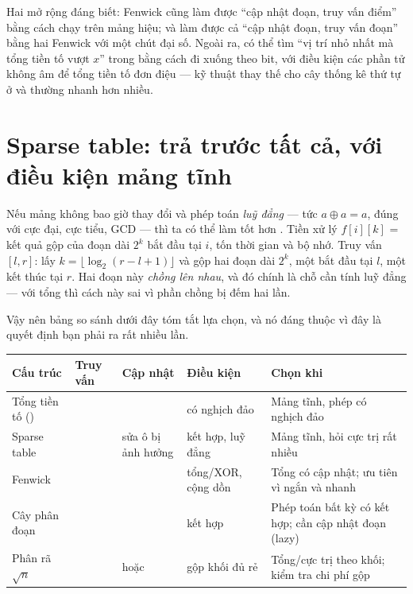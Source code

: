 \documentclass[../../algorithm.tex]{subfiles}
\begin{document}
Hai mở rộng đáng biết: Fenwick cũng làm được ``cập nhật đoạn, truy vấn điểm'' bằng cách chạy trên mảng hiệu; và làm được cả ``cập nhật đoạn, truy vấn đoạn'' bằng hai Fenwick với một chút đại số. Ngoài ra, có thể tìm ``vị trí nhỏ nhất mà tổng tiền tố vượt \(x\)'' trong  bằng cách đi xuống theo bit, với điều kiện các phần tử không âm để tổng tiền tố đơn điệu --- kỹ thuật thay thế cho cây thống kê thứ tự ở  và thường nhanh hơn nhiều.

\section{Sparse table: trả trước tất cả, với điều kiện mảng tĩnh}

Nếu mảng không bao giờ thay đổi và phép toán \emph{luỹ đẳng} --- tức \(a \oplus a = a\), đúng với cực đại, cực tiểu, GCD --- thì ta có thể làm tốt hơn . Tiền xử lý \(f[i][k]\) = kết quả gộp của đoạn dài \(2^k\) bắt đầu tại \(i\), tốn  thời gian và bộ nhớ. Truy vấn \([l,r]\): lấy \(k = \lfloor\log_2(r-l+1)\rfloor\) và gộp hai đoạn dài \(2^k\), một bắt đầu tại \(l\), một kết thúc tại \(r\). Hai đoạn này \emph{chồng lên nhau}, và đó chính là chỗ cần tính luỹ đẳng --- với tổng thì cách này sai vì phần chồng bị đếm hai lần.

Vậy nên bảng so sánh dưới đây tóm tắt lựa chọn, và nó đáng thuộc vì đây là quyết định bạn phải ra rất nhiều lần.

\begin{center}\footnotesize
\begin{tabularx}{\linewidth}{@{}L{3.0cm}L{2.1cm}L{2.1cm}L{2.4cm}Y@{}}
\toprule
\textbf{Cấu trúc} & \textbf{Truy vấn} & \textbf{Cập nhật} & \textbf{Điều kiện} & \textbf{Chọn khi}\\
\midrule
Tổng tiền tố () &  &  & có nghịch đảo & Mảng tĩnh, phép có nghịch đảo\\
Sparse table &  &  sửa ô bị ảnh hưởng & kết hợp, luỹ đẳng & Mảng tĩnh, hỏi cực trị rất nhiều\\
Fenwick &  &  & tổng/XOR, cộng dồn & Tổng có cập nhật; ưu tiên vì ngắn và nhanh\\
Cây phân đoạn &  &  & kết hợp & Phép toán bất kỳ có kết hợp; cần cập nhật đoạn (lazy)\\
Phân rã \(\sqrt{n}\) &  &  hoặc  & gộp khối đủ rẻ & Tổng/cực trị theo khối; kiểm tra chi phí gộp\\
\bottomrule
\end{tabularx}
\end{center}
\end{document}

